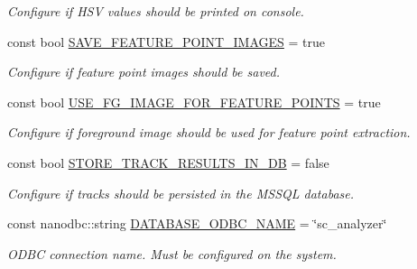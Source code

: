 \begin{DoxyCompactItemize}
\begin{DoxyCompactList}\small\item\em Configure if H\+SV values should be printed on console. \end{DoxyCompactList}\item 
\mbox{\label{namespacedto_1_1_configuration_a1226012405f5e2d9affcbd0f993eddf1}} 
const bool \mbox{\hyperlink{namespacedto_1_1_configuration_a1226012405f5e2d9affcbd0f993eddf1}{S\+A\+V\+E\+\_\+\+F\+E\+A\+T\+U\+R\+E\+\_\+\+P\+O\+I\+N\+T\+\_\+\+I\+M\+A\+G\+ES}} = true
\begin{DoxyCompactList}\small\item\em Configure if feature point images should be saved. \end{DoxyCompactList}\item 
\mbox{\label{namespacedto_1_1_configuration_a5274d3c45aed23e3bd0dc406595c9246}} 
const bool \mbox{\hyperlink{namespacedto_1_1_configuration_a5274d3c45aed23e3bd0dc406595c9246}{U\+S\+E\+\_\+\+F\+G\+\_\+\+I\+M\+A\+G\+E\+\_\+\+F\+O\+R\+\_\+\+F\+E\+A\+T\+U\+R\+E\+\_\+\+P\+O\+I\+N\+TS}} = true
\begin{DoxyCompactList}\small\item\em Configure if foreground image should be used for feature point extraction. \end{DoxyCompactList}\item 
\mbox{\label{namespacedto_1_1_configuration_aa2f22d1bb89f89b5259c344ff353a15f}} 
const bool \mbox{\hyperlink{namespacedto_1_1_configuration_aa2f22d1bb89f89b5259c344ff353a15f}{S\+T\+O\+R\+E\+\_\+\+T\+R\+A\+C\+K\+\_\+\+R\+E\+S\+U\+L\+T\+S\+\_\+\+I\+N\+\_\+\+DB}} = false
\begin{DoxyCompactList}\small\item\em Configure if tracks should be persisted in the M\+S\+S\+QL database. \end{DoxyCompactList}\item 
\mbox{\label{namespacedto_1_1_configuration_a07b9407299de85875ecc2c4effd6f20e}} 
const nanodbc\+::string \mbox{\hyperlink{namespacedto_1_1_configuration_a07b9407299de85875ecc2c4effd6f20e}{D\+A\+T\+A\+B\+A\+S\+E\+\_\+\+O\+D\+B\+C\+\_\+\+N\+A\+ME}} = \char`\"{}sc\+\_\+analyzer\char`\"{}
\begin{DoxyCompactList}\small\item\em O\+D\+BC connection name. Must be configured on the system. \end{DoxyCompactList}\item 

\end{DoxyCompactItemize}
